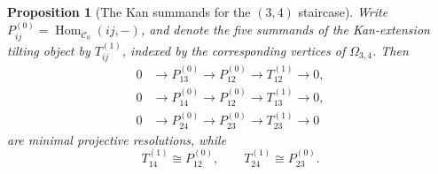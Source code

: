 \documentclass[12pt,a4paper,english,reqno]{amsart}
\theoremstyle{plain}
\newtheorem{proposition}[theorem]{Proposition}
\theoremstyle{definition}
\newcommand{\Hom}{\operatorname{Hom}}
\newcommand{\C}{\mathcal C}
\begin{document}
\begin{proposition}[The Kan summands for the $(3,4)$ staircase]
\label{prop:34-Kan-resolutions}
Write $P_{ij}^{(0)}=\Hom_{\C_0}(ij,-)$, and denote the five summands of
the Kan-extension tilting object by $T_{ij}^{(1)}$, indexed by the
corresponding vertices of $\Omega_{3,4}$.  Then
\[
\begin{aligned}
 0&\longrightarrow P_{13}^{(0)}
   \longrightarrow P_{12}^{(0)}
   \longrightarrow T_{12}^{(1)}
   \longrightarrow0,\\
 0&\longrightarrow P_{14}^{(0)}
   \longrightarrow P_{12}^{(0)}
   \longrightarrow T_{13}^{(1)}
   \longrightarrow0,\\
 0&\longrightarrow P_{24}^{(0)}
   \longrightarrow P_{23}^{(0)}
   \longrightarrow T_{23}^{(1)}
   \longrightarrow0
\end{aligned}
\]
are minimal projective resolutions, while
\[
 T_{14}^{(1)}\cong P_{12}^{(0)},
 \qquad
 T_{24}^{(1)}\cong P_{23}^{(0)}.
\]
\end{proposition}
\end{document}
